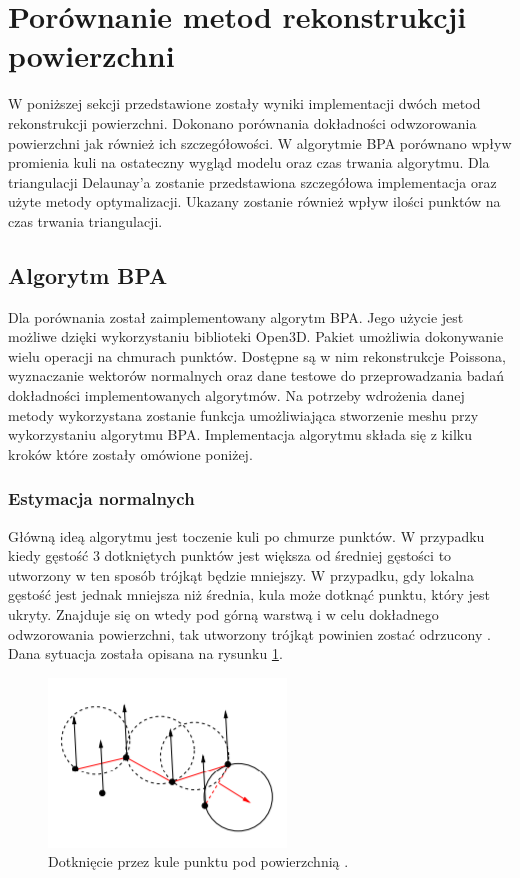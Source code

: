 \section{Porównanie metod rekonstrukcji powierzchni}
W poniższej sekcji przedstawione zostały wyniki implementacji dwóch metod rekonstrukcji powierzchni. Dokonano porównania dokładności odwzorowania powierzchni jak również ich szczegółowości. W algorytmie BPA porównano wpływ promienia kuli na ostateczny wygląd modelu oraz czas trwania algorytmu. Dla triangulacji Delaunay'a zostanie przedstawiona szczegółowa implementacja oraz użyte metody optymalizacji. Ukazany zostanie również wpływ ilości punktów na czas trwania triangulacji.

\subsection{Algorytm BPA}
Dla porównania został zaimplementowany algorytm BPA. Jego użycie jest możliwe dzięki wykorzystaniu biblioteki Open3D. Pakiet umożliwia dokonywanie wielu operacji na chmurach punktów. Dostępne są w nim rekonstrukcje Poissona, wyznaczanie wektorów normalnych oraz dane testowe do przeprowadzania badań dokładności implementowanych algorytmów. Na potrzeby wdrożenia danej metody wykorzystana zostanie funkcja umożliwiająca stworzenie meshu przy wykorzystaniu algorytmu BPA. Implementacja algorytmu składa się z kilku kroków które zostały omówione poniżej.
\subsubsection{Estymacja normalnych}
Główną ideą algorytmu jest toczenie kuli po chmurze punktów. W przypadku kiedy gęstość 3 dotkniętych punktów jest większa od średniej gęstości to utworzony w ten sposób trójkąt będzie mniejszy. W przypadku, gdy lokalna gęstość jest jednak mniejsza niż średnia, kula może dotknąć punktu, który jest ukryty. Znajduje się on wtedy pod górną warstwą i w celu dokładnego odwzorowania powierzchni, tak utworzony trójkąt powinien zostać odrzucony \cite{mittleman1999ball}. Dana sytuacja została opisana na rysunku \ref{fig:bpaWrongTria}.
\begin{figure}[H]
  \centering
  \includegraphics[scale=0.8]{bpa_wrong.PNG}
  \caption{Dotknięcie przez kule punktu pod powierzchnią \cite{mittleman1999ball}.}   
  \label{fig:bpaWrongTria}
\end{figure}

